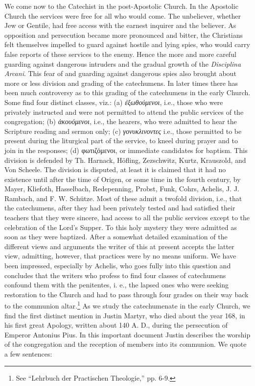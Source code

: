 We come now to the Catechist in the post-Apostolic Church. In the Apostolic Church the services were free for all who would come. The unbeliever, whether Jew or Gentile, had free access with the earnest inquirer and the believer. As opposition and persecution became more pronounced and bitter, the Christians felt themselves impelled to guard against hostile and lying spies, who would carry false reports of these services to the enemy. Hence the more and more careful guarding against dangerous intruders and the gradual growth of the \emph{Disciplina Arcani}. This fear of and guarding against dangerous spies also brought about more or less division and grading of the catechumens. In later times there has been much controversy as to this grading of the catechumens in the early Church. Some find four distinct classes, viz.: (a) \emph{ἐξωθούμενοι}, i.e., those who were privately instructed and were not permitted to attend the public services of the congregation; (b) \emph{ἀκουόμενοι}, i.e., the hearers, who were admitted to hear the Scripture reading and sermon only; (c) \emph{γονυκλινοντες} i.e., those permitted to
be present during the liturgical part of the service, to kneel during prayer and to join in the responses; (d) φωτιζόμενοι, or immediate candidates for baptism. This division is defended by Th. Harnack, Höfling, Zezschwitz, Kurtz, Krauszold, and Von Scheele. The division is disputed, at least it is claimed that it had no existence until after the time of Origen, or some time in the fourth century, by Mayer, Kliefoth, Hasselbach, Redepenning, Probst, Funk, Cohrs, Achelis, J. J. Rambach, and F. W. Schütze. Most of these admit a twofold division, i.e., that the catechumens, after they had been privately tested and had satisfied their teachers that they were sincere, had access to all the public services except to the celebration of the Lord’s Supper. To this holy mystery they were admitted as soon as they were baptized. After a somewhat detailed examination of the different views and arguments the writer of this at present accepts the latter view, admitting, however, that practices were by no means uniform. We have been impressed, especially by Achelis, who goes fully into this question and concludes that the writers who profess to find four classes of catechumens confound them with the penitentes, i. e., the lapsed ones who were seeking restoration to the Church and had to pass through four grades on their way back to the communion altar.\footnote{See “Lehrbuch der Practischen Theologie,” pp. 6-9.}
 As we study the catechumenate in the early Church, we find the first distinct mention in Justin Martyr, who died about the year 168, in his first great Apology, written about 140 A. D., during the persecution of Emperor Antonius Pius. In this important document Justin describes the worship of the congregation and the reception of members into its communion. We quote a few sentences:


